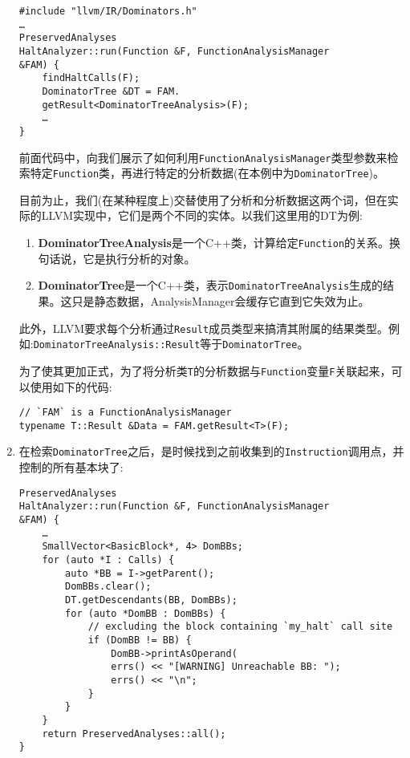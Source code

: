 \begin{enumerate}
\begin{lstlisting}[style=styleCXX]
#include "llvm/IR/Dominators.h"
…
PreservedAnalyses
HaltAnalyzer::run(Function &F, FunctionAnalysisManager
&FAM) {
	findHaltCalls(F);
	DominatorTree &DT = FAM.
	getResult<DominatorTreeAnalysis>(F);
	…
}
\end{lstlisting}

前面代码中，向我们展示了如何利用\texttt{FunctionAnalysisManager}类型参数来检索特定\texttt{Function}类，再进行特定的分析数据(在本例中为\texttt{DominatorTree})。

目前为止，我们(在某种程度上)交替使用了分析和分析数据这两个词，但在实际的LLVM实现中，它们是两个不同的实体。以我们这里用的DT为例:

\begin{enumerate}[label=\alph*)]
\item \textbf{DominatorTreeAnalysis}是一个C++类，计算给定\texttt{Function}的关系。换句话说，它是执行分析的对象。

\item \textbf{DominatorTree}是一个C++类，表示\texttt{DominatorTreeAnalysis}生成的结果。这只是静态数据，AnalysisManager会缓存它直到它失效为止。

\end{enumerate}

此外，LLVM要求每个分析通过\texttt{Result}成员类型来搞清其附属的结果类型。例如:\texttt{DominatorTreeAnalysis::Result}等于\texttt{DominatorTree}。

为了使其更加正式，为了将分析类\texttt{T}的分析数据与\texttt{Function}变量\texttt{F}关联起来，可以使用如下的代码:

\begin{lstlisting}[style=styleCXX]
// `FAM` is a FunctionAnalysisManager
typename T::Result &Data = FAM.getResult<T>(F);
\end{lstlisting}

\item 在检索\texttt{DominatorTree}之后，是时候找到之前收集到的\texttt{Instruction}调用点，并控制的所有基本块了:

\begin{lstlisting}[style=styleCXX]
PreservedAnalyses
HaltAnalyzer::run(Function &F, FunctionAnalysisManager
&FAM) {
	…
	SmallVector<BasicBlock*, 4> DomBBs;
	for (auto *I : Calls) {
		auto *BB = I->getParent();
		DomBBs.clear();
		DT.getDescendants(BB, DomBBs);
		for (auto *DomBB : DomBBs) {
			// excluding the block containing `my_halt` call site
			if (DomBB != BB) {
				DomBB->printAsOperand(
				errs() << "[WARNING] Unreachable BB: ");
				errs() << "\n";
			}
		}
	}
	return PreservedAnalyses::all();
}
\end{lstlisting}


\end{enumerate}
